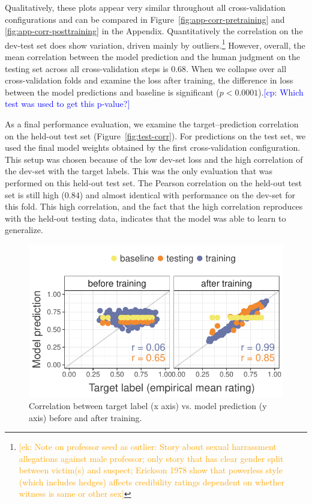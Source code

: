 \documentclass[11pt,a4paper]{article}
\newcommand{\ek}[1]{\textcolor{Orange}{[ek: #1]}}
\newcommand{\cp}[1]{\textcolor{Blue}{[cp: #1]}}
\begin{document}
Qualitatively, these plots appear very similar throughout all cross-validation configurations and can be compared in Figure~\ref{fig:app-corr-pretraining} and \ref{fig:app-corr-posttraining} in the Appendix. Quantitatively the correlation on the dev-test set does show variation, driven mainly by outliers.\footnote{\ek{Note on professor seed as outlier: Story about sexual harrassment allegations against male professor; only story that has clear gender split between victim(s) and suspect; Erickson 1978 show that powerless style (which includes hedges) affects credibility ratings dependent on whether witness is same or other sex}} However, overall, the mean correlation between the model prediction and the human judgment on the testing set across all cross-validation steps is $0.68$. When we collapse over all cross-validation folds and examine the loss after training, the difference in loss between the model predictions and baseline is significant ($p<0.0001$).\cp{Which test was used to get this p-value?}

As a final performance evaluation, we examine the target--prediction correlation on the held-out test set (Figure~\ref{fig:test-corr}). For predictions on the test set, we used the final model weights obtained by the first cross-validation configuration. This setup was chosen because of the low dev-set loss and the high correlation of the dev-set with the target labels. This was the only evaluation that was performed on this held-out test set. The Pearson correlation on the held-out test set is still high ($0.84$) and almost identical with performance on the dev-set for this fold. This high correlation, and the fact that the high correlation reproduces with the held-out testing data, indicates that the model was able to learn to generalize.

\begin{figure}
  \includegraphics[width=\linewidth]{graphs/cv0-pred-target-epoch0-29.pdf}
  \caption{Correlation between target label (x axis) vs. model prediction (y axis) before and after training.}
  \label{fig:corr-cv0}
\end{figure}
\end{document}
